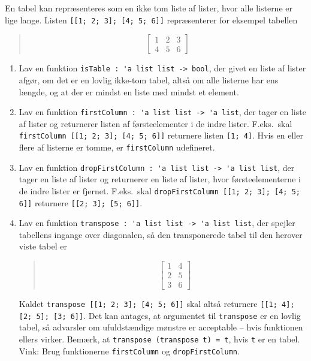 En tabel kan repræsenteres som en ikke tom liste af lister, hvor alle listerne er lige lange. Listen \lstinline{[[1; 2; 3]; [4; 5; 6]]} repræsenterer for eksempel tabellen
  \begin{quote}
\[\left [\begin{array}{rrr}
1 & 2 & 3 \\
4 & 5 & 6
\end{array}
\right ]\]
\end{quote}
\begin{enumerate}
\item Lav en funktion \lstinline{isTable : 'a list list -> bool}, der givet en liste af lister afgør, om det er en lovlig ikke-tom tabel, altså om alle listerne har ens længde, og at der er mindst en liste med mindst et element.
\item Lav en funktion \lstinline{firstColumn : 'a list list -> 'a list}, der tager en liste af lister og returnerer listen af førsteelementer i de indre lister.  F.eks.\ skal \lstinline{firstColumn [[1; 2; 3]; [4; 5; 6]]} returnere listen \lstinline{[1; 4]}.  Hvis en eller flere af listerne er tomme, er \lstinline{firstColumn} udefineret.
\item Lav en funktion \lstinline{dropFirstColumn : 'a list list -> 'a list list}, der tager en liste af lister og returnerer en liste af lister, hvor førsteelementerne i de indre lister er fjernet.  F.eks.\ skal \lstinline{dropFirstColumn [[1; 2; 3]; [4; 5; 6]]} returnere \lstinline{[[2; 3]; [5; 6]]}.
\item Lav en funktion \lstinline{transpose : 'a list list -> 'a list list}, der spejler tabellens ingange over diagonalen, så den transponerede tabel til den herover viste tabel er
  \begin{quote}
\[\left [\begin{array}{rr}
1 & 4 \\
2 & 5 \\
3 & 6
\end{array}
\right ]\]
\end{quote}
Kaldet \lstinline{transpose [[1; 2; 3]; [4; 5; 6]]} skal altså returnere \lstinline{[[1; 4]; [2; 5]; [3; 6]]}.  Det kan antages, at argumentet til \lstinline{transpose} er en lovlig tabel, så advarsler om ufuldstændige mønstre er acceptable -- hvis funktionen ellers virker.  Bemærk, at \lstinline{transpose (transpose t) = t}, hvis \lstinline{t} er en tabel.  Vink: Brug funktionerne \lstinline{firstColumn} og \lstinline{dropFirstColumn}.
\end{enumerate}
